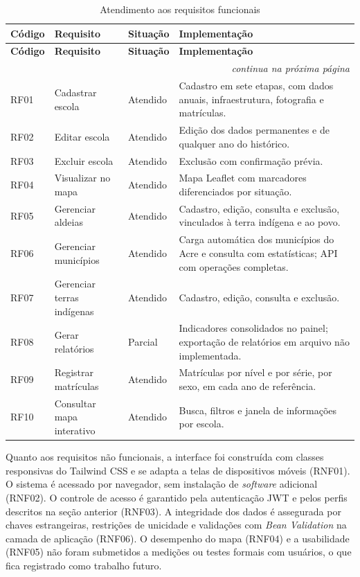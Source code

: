 \begin{longtable}{p{1.5cm}p{3cm}p{2.2cm}p{6.8cm}}
\caption{Atendimento aos requisitos funcionais}
\label{qua:atendimentorf} \\
\toprule
\textbf{Código} & \textbf{Requisito} & \textbf{Situação} & \textbf{Implementação} \\
\midrule
\endfirsthead
\toprule
\textbf{Código} & \textbf{Requisito} & \textbf{Situação} & \textbf{Implementação} \\
\midrule
\endhead
\midrule
\multicolumn{4}{r}{\small\textit{continua na próxima página}} \\
\endfoot
\bottomrule
\endlastfoot
RF01 & Cadastrar escola          & Atendido & Cadastro em sete etapas, com dados anuais, infraestrutura, fotografia e matrículas. \\[3pt]
RF02 & Editar escola             & Atendido & Edição dos dados permanentes e de qualquer ano do histórico. \\[3pt]
RF03 & Excluir escola            & Atendido & Exclusão com confirmação prévia. \\[3pt]
RF04 & Visualizar no mapa        & Atendido & Mapa Leaflet com marcadores diferenciados por situação. \\[3pt]
RF05 & Gerenciar aldeias         & Atendido & Cadastro, edição, consulta e exclusão, vinculados à terra indígena e ao povo. \\[3pt]
RF06 & Gerenciar municípios      & Atendido & Carga automática dos municípios do Acre e consulta com estatísticas; API com operações completas. \\[3pt]
RF07 & Gerenciar terras indígenas & Atendido & Cadastro, edição, consulta e exclusão. \\[3pt]
RF08 & Gerar relatórios          & Parcial  & Indicadores consolidados no painel; exportação de relatórios em arquivo não implementada. \\[3pt]
RF09 & Registrar matrículas      & Atendido & Matrículas por nível e por série, por sexo, em cada ano de referência. \\[3pt]
RF10 & Consultar mapa interativo & Atendido & Busca, filtros e janela de informações por escola. \\
\end{longtable}

Quanto aos requisitos não funcionais, a interface foi construída com classes responsivas do Tailwind CSS e se adapta a telas de dispositivos móveis (RNF01). O sistema é acessado por navegador, sem instalação de \textit{software} adicional (RNF02). O controle de acesso é garantido pela autenticação JWT e pelos perfis descritos na seção anterior (RNF03). A integridade dos dados é assegurada por chaves estrangeiras, restrições de unicidade e validações com \textit{Bean Validation} na camada de aplicação (RNF06). O desempenho do mapa (RNF04) e a usabilidade (RNF05) não foram submetidos a medições ou testes formais com usuários, o que fica registrado como trabalho futuro.

